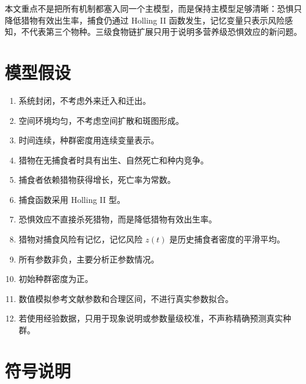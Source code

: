 \documentclass{article}
\begin{document}
本文重点不是把所有机制都塞入同一个主模型，而是保持主模型足够清晰：恐惧只降低猎物有效出生率，捕食仍通过 Holling II 函数发生，记忆变量只表示风险感知，不代表第三个物种。三级食物链扩展只用于说明多营养级恐惧效应的新问题。

\section{模型假设}

\begin{enumerate}[label=\textbf{H\arabic*.}]
    \item 系统封闭，不考虑外来迁入和迁出。
    \item 空间环境均匀，不考虑空间扩散和斑图形成。
    \item 时间连续，种群密度用连续变量表示。
    \item 猎物在无捕食者时具有出生、自然死亡和种内竞争。
    \item 捕食者依赖猎物获得增长，死亡率为常数。
    \item 捕食函数采用 Holling II 型。
    \item 恐惧效应不直接杀死猎物，而是降低猎物有效出生率。
    \item 猎物对捕食风险有记忆，记忆风险 $z(t)$ 是历史捕食者密度的平滑平均。
    \item 所有参数非负，主要分析正参数情况。
    \item 初始种群密度为正。
    \item 数值模拟参考文献参数和合理区间，不进行真实参数拟合。
    \item 若使用经验数据，只用于现象说明或参数量级校准，不声称精确预测真实种群。
\end{enumerate}

\section{符号说明}
\end{document}
